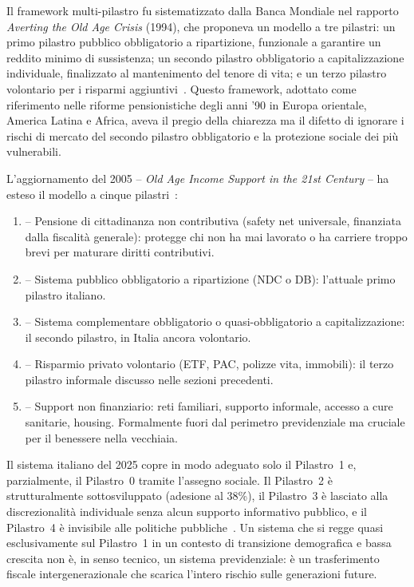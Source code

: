 Il framework multi-pilastro fu sistematizzato dalla Banca Mondiale nel
rapporto \emph{Averting the Old Age Crisis} (1994), che proponeva un modello
a tre pilastri: un primo pilastro pubblico obbligatorio a ripartizione,
funzionale a garantire un reddito minimo di sussistenza; un secondo pilastro
obbligatorio a capitalizzazione individuale, finalizzato al mantenimento del
tenore di vita; e un terzo pilastro volontario per i risparmi
aggiuntivi~\cite{WorldBank1994}. Questo framework, adottato come
riferimento nelle riforme pensionistiche degli anni '90 in Europa orientale,
America Latina e Africa, aveva il pregio della chiarezza ma il difetto di
ignorare i rischi di mercato del secondo pilastro obbligatorio e la
protezione sociale dei più vulnerabili.

L'aggiornamento del 2005 -- \emph{Old Age Income Support in the 21st Century}
-- ha esteso il modello a cinque pilastri~\cite{WorldBank2005}:
%
\begin{enumerate}
  \item[\textbf{Pilastro 0}] -- Pensione di cittadinanza non contributiva
    (safety net universale, finanziata dalla fiscalità generale): protegge
    chi non ha mai lavorato o ha carriere troppo brevi per maturare diritti
    contributivi.
  \item[\textbf{Pilastro 1}] -- Sistema pubblico obbligatorio a ripartizione
    (NDC o DB): l'attuale primo pilastro italiano.
  \item[\textbf{Pilastro 2}] -- Sistema complementare obbligatorio o
    quasi-obbligatorio a capitalizzazione: il secondo pilastro, in Italia
    ancora volontario.
  \item[\textbf{Pilastro 3}] -- Risparmio privato volontario (ETF, PAC,
    polizze vita, immobili): il terzo pilastro informale discusso nelle
    sezioni precedenti.
  \item[\textbf{Pilastro 4}] -- Support non finanziario: reti familiari,
    supporto informale, accesso a cure sanitarie, housing. Formalmente fuori
    dal perimetro previdenziale ma cruciale per il benessere nella vecchiaia.
\end{enumerate}
%
Il sistema italiano del 2025 copre in modo adeguato solo il Pilastro~1 e,
parzialmente, il Pilastro~0 tramite l'assegno sociale. Il Pilastro~2 è
strutturalmente sottosviluppato (adesione al 38\%), il Pilastro~3 è
lasciato alla discrezionalità individuale senza alcun supporto informativo
pubblico, e il Pilastro~4 è invisibile alle politiche
pubbliche~\cite{WorldBank2005, MEFRGS2025}. Un sistema che si regge quasi
esclusivamente sul Pilastro~1 in un contesto di transizione demografica
e bassa crescita non è, in senso tecnico, un sistema previdenziale: è
un trasferimento fiscale intergenerazionale che scarica l'intero rischio
sulle generazioni future.

